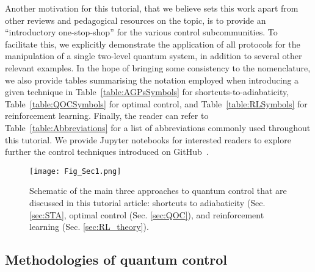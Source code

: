 Another motivation for this tutorial, that we believe sets this work apart from other reviews and pedagogical resources on the topic, is to provide an ``introductory one-stop-shop'' for the various control subcommunities. To facilitate this, we explicitly demonstrate the application of all protocols for the manipulation of a single two-level quantum system, in addition to several other relevant examples.  In the hope of bringing some consistency to the nomenclature, we also provide tables summarising the notation employed when introducing a given technique in Table~\ref{table:AGPsSymbols} for shortcuts-to-adiabaticity, Table~\ref{table:QOCSymbols} for optimal control, and Table~\ref{table:RLSymbols} for reinforcement learning. Finally, the reader can refer to Table~\ref{table:Abbreviations} for a list of abbreviations commonly used throughout this tutorial.
We provide Jupyter notebooks for interested readers to explore further the control techniques introduced on GitHub~\cite{github_code}.

\begin{figure}[t]
\texttt{[image: Fig\_Sec1.png]}
\label{fig:scope}
\caption{Schematic of the main three approaches to quantum control that are discussed in this tutorial article: shortcuts to adiabaticity (Sec. \ref{sec:STA}, optimal control (Sec. \ref{sec:QOC}), and reinforcement learning (Sec. \ref{sec:RL_theory}). }
\end{figure}

\subsection{Methodologies of quantum control}

